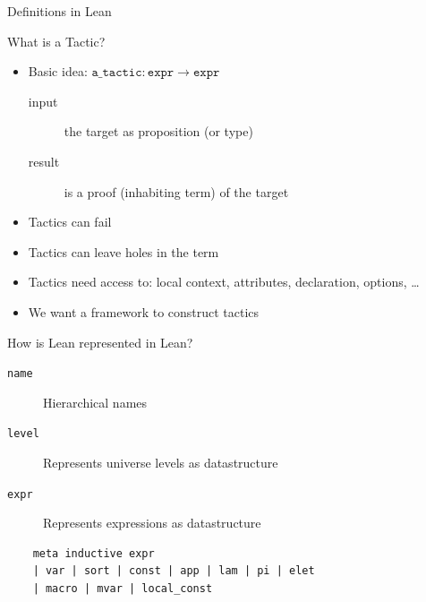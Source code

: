 \documentclass[usenames,dvipsnames]{beamer}
\begin{document}
\begin{frame}{Definitions in Lean}

\end{frame}

\begin{frame}{What is a Tactic?}
  \begin{itemize}
    \item Basic idea: $\texttt{a\_tactic} : \texttt{expr} \rightarrow \texttt{expr}$
    \begin{description}
      \item[input] the target as proposition (or type)
      \item[result] is a proof (inhabiting term) of the target
    \end{description}
    \item Tactics can fail
    \item Tactics can leave holes in the term
    \item Tactics need access to: local context, attributes, declaration, options, \ldots
    \item We want a framework to construct tactics
  \end{itemize}

\end{frame}

\begin{frame}[fragile]{How is Lean represented in Lean?}
  \begin{description}
    \item[\texttt{name}] Hierarchical names
    \item[\texttt{level}] Represents universe levels as datastructure
    \item[\texttt{expr}] Represents expressions as datastructure
  \end{description}
  \begin{lstlisting}
    meta inductive expr
    | var | sort | const | app | lam | pi | elet
    | macro | mvar | local_const
    \end{lstlisting}
\end{frame}
\end{document}
